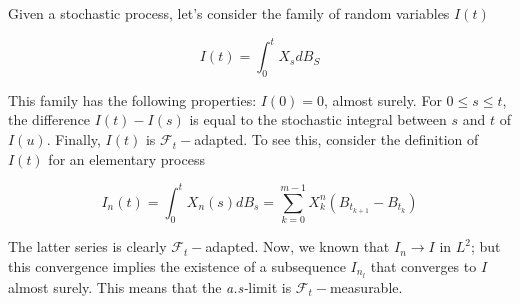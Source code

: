 Given a stochastic process, let's consider the family of random variables $I(t)$

\begin{equation*}
    I(t) = \int_0^t X_s dB_S
\end{equation*}

This family has the following properties: $I(0) = 0$, almost surely. For $0 \leq s \leq t$, the difference $I(t)-I(s)$ is equal to the stochastic integral between $s$ and $t$ of $I(u)$. Finally, $I(t)$ is $\mathcal{F}_t-$adapted. To see this, consider the definition of $I(t)$ for an elementary process

\begin{equation*}
    I_n(t) = \int_0^t X_n(s) dB_s = \sum_{k=0}^{m-1} X_k^n (B_{t_{k+1}}-B_{t_k}) 
\end{equation*}

The latter series is clearly $\mathcal{F}_t-$adapted. Now, we known that $I_n \to I$ in $L^2$; but this convergence implies the existence of a subsequence $I_{n_l}$ that converges to $I$ almost surely. This means that the \textit{a.s-}limit is $\mathcal{F}_t-$measurable.

